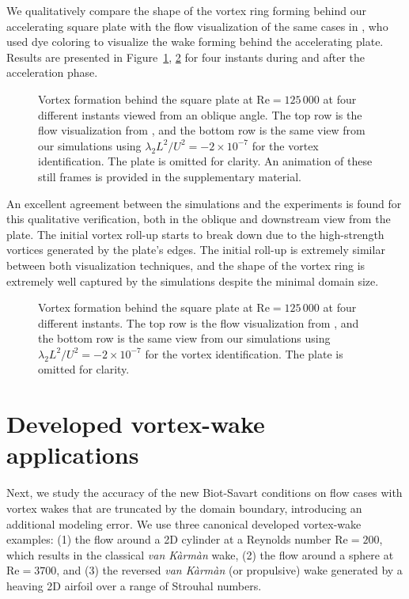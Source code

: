 \documentclass[final,1p,times]{elsarticle}
\begin{document}
We qualitatively compare the shape of the vortex ring forming behind our accelerating square plate with the flow visualization of the same cases in \cite{Higuchi1996Three-dimensionalPlates}, who used dye coloring to visualize the wake forming behind the accelerating plate. Results are presented in Figure~\ref{fig:square_disk_comparison_oblique}, \ref{fig:square_disk_comparison} for four instants during and after the acceleration phase. 

\begin{figure}
    \centering
    \def\svgwidth{1\columnwidth}
    
    \caption{Vortex formation behind the square plate at $\text{Re}=125\,000$ at four different instants viewed from an oblique angle. The top row is the flow visualization from \cite{Higuchi1996Three-dimensionalPlates}, and the bottom row is the same view from our simulations using $\lambda_2L^2/U^2=-2\times10^{-7}$ for the vortex identification. The plate is omitted for clarity. An animation of these still frames is provided in the supplementary material.}
    \label{fig:square_disk_comparison_oblique}
\end{figure}
An excellent agreement between the simulations and the experiments is found for this qualitative verification, both in the oblique and downstream view from the plate. The initial vortex roll-up starts to break down due to the high-strength vortices generated by the plate's edges. The initial roll-up is extremely similar between both visualization techniques, and the shape of the vortex ring is extremely well captured by the simulations despite the minimal domain size.
\begin{figure}
    \centering
    \def\svgwidth{1\columnwidth}
    
    \caption{Vortex formation behind the square plate at $\text{Re}=125\,000$ at four different instants. The top row is the flow visualization from \cite{Higuchi1996Three-dimensionalPlates}, and the bottom row is the same view from our simulations using $\lambda_2L^2/U^2=-2\times10^{-7}$ for the vortex identification. The plate is omitted for clarity.}
    \label{fig:square_disk_comparison}
\end{figure}

\section{Developed vortex-wake applications}

Next, we study the accuracy of the new Biot-Savart conditions on flow cases with vortex wakes that are truncated by the domain boundary, introducing an additional modeling error. We use three canonical developed vortex-wake examples: (1) the flow around a 2D cylinder at a Reynolds number $\text{Re}=200$, which results in the classical \emph{van K\`arm\`an} wake, (2) the flow around a sphere at $\text{Re}=3700$, and (3) the reversed \emph{van K\`arm\`an} (or propulsive) wake generated by a heaving 2D airfoil over a range of Strouhal numbers.
\end{document}
